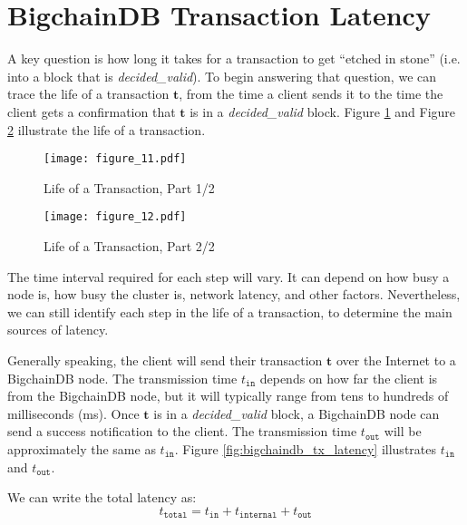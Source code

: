 \section{BigchainDB Transaction Latency}\label{sec:latency}

A key question is how long it takes for a transaction to get “etched in stone” (i.e. into a block that is \textsf{\textit{decided\_valid}}). 
To begin answering that question, we can trace the life of a transaction $\mathbf{t}$, from the time a client sends it to the time the client gets a confirmation that $\mathbf{t}$ is in a \textsf{\textit{decided\_valid}} block. 
Figure \ref{fig:bigchaindb_tx_life_1} and Figure \ref{fig:bigchaindb_tx_life_2} illustrate the life of a transaction.

\begin{figure}[!ht]
  \centering
  \texttt{[image: figure\_11.pdf]}
  \caption{Life of a Transaction, Part 1/2}
  \label{fig:bigchaindb_tx_life_1}
\end{figure}

\begin{figure}[!ht]
  \centering
  \texttt{[image: figure\_12.pdf]}
  \caption{Life of a Transaction, Part 2/2}
  \label{fig:bigchaindb_tx_life_2}
\end{figure}

The time interval required for each step will vary. 
It can depend on how busy a node is, how busy the cluster is, network latency, and other factors. 
Nevertheless, we can still identify each step in the life of a transaction, to determine the main sources of latency.

Generally speaking, the client will send their transaction $\mathbf{t}$ over the Internet to a BigchainDB node. 
The transmission time $t_{\mathtt{in}}$ depends on how far the client is from the BigchainDB node, but it will typically range from tens to hundreds of milliseconds (ms). 
Once $\mathbf{t}$ is in a \textsf{\textit{decided\_valid}} block, a BigchainDB node can send a success notification to the client. 
The transmission time $t_{\mathtt{out}}$ will be approximately the same as $t_{\mathtt{in}}$. 
Figure \ref{fig:bigchaindb_tx_latency} illustrates $t_{\mathtt{in}}$ and $t_{\mathtt{out}}$.

We can write the total latency as:
\begin{equation}
  t_\mathtt{total} = t_{\mathtt{in}} + t_{\mathtt{internal}} + t_{\mathtt{out}}
\end{equation}

